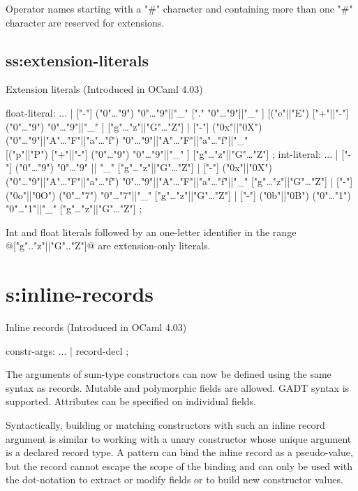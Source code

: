 {Operator names starting with a "#" character and containing more than
one "#" character are reserved for extensions.

\subsection{ss:extension-literals}{Extension literals}
(Introduced in OCaml 4.03)
\begin{syntax}
float-literal:
       ...
     | ["-"] ("0"\ldots"9") { "0"\ldots"9"||"_" } ["." { "0"\ldots"9"||"_" }]
       [("e"||"E") ["+"||"-"] ("0"\ldots"9") { "0"\ldots"9"||"_" }]
       ["g"\ldots"z"||"G"\ldots"Z"]
     | ["-"] ("0x"||"0X")
       ("0"\ldots"9"||"A"\ldots"F"||"a"\ldots"f")
       { "0"\ldots"9"||"A"\ldots"F"||"a"\ldots"f"||"_" }\\
       ["." { "0"\ldots"9"||"A"\ldots"F"||"a"\ldots"f"||"_" }]
       [("p"||"P") ["+"||"-"] ("0"\ldots"9") { "0"\ldots"9"||"_" }]
       ["g"\ldots"z"||"G"\ldots"Z"]
;
int-literal:
           ...
        | ["-"] ("0"\ldots"9") { "0"\ldots"9" || "_" }["g"\ldots"z"||"G"\ldots"Z"]
        | ["-"] ("0x"||"0X") ("0"\ldots"9"||"A"\ldots"F"||"a"\ldots"f")
          { "0"\ldots"9"||"A"\ldots"F"||"a"\ldots"f"||"_" }
          ["g"\ldots"z"||"G"\ldots"Z"]
        | ["-"] ("0o"||"0O") ("0"\ldots"7") { "0"\ldots"7"||"_" }
          ["g"\ldots"z"||"G"\ldots"Z"]
        | ["-"] ("0b"||"0B") ("0"\ldots"1") { "0"\ldots"1"||"_" }
          ["g"\ldots"z"||"G"\ldots"Z"]
;
\end{syntax}
Int and float literals followed by an one-letter identifier in the
range @["g".."z"||"G".."Z"]@ are extension-only literals.

\section{s:inline-records}{Inline records}
(Introduced in OCaml 4.03)
\begin{syntax}
  constr-args:
          ...
          | record-decl
;
\end{syntax}

The arguments of sum-type constructors can now be defined using the
same syntax as records.  Mutable and polymorphic fields are allowed.
GADT syntax is supported.  Attributes can be specified on individual
fields.

Syntactically, building or matching constructors with such an inline
record argument is similar to working with a unary constructor whose
unique argument is a declared record type.  A pattern can bind
the inline record as a pseudo-value, but the record cannot escape the
scope of the binding and can only be used with the dot-notation to
extract or modify fields or to build new constructor values.

}
